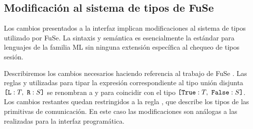 \subsection{Modificación al sistema de tipos de FuSe}

Los cambios presentados a la interfaz implican modificaciones al sistema de
tipos utilizado por FuSe. La sintaxis y semántica es esencialmente la estándar
para lenguajes de la familia ML sin ninguna extensión específica al chequeo de
tipos sesión.

Describiremos los cambios necesarios haciendo referencia al trabajo de FuSe
. Las reglas  y 
utilizadas para tipar la expresión correspondiente al tipo unión disjunta
$\set{ \Tag[L] : T,\ \Tag[R] : S}$ se renombran a  y
 para coincidir con el tipo $\BinaryLabels{T}{S}$. Los
cambios restantes quedan restringidos a la regla , que
describe los tipos de las primitivas de comunicación. En este caso las
modificaciones son análogas a las realizadas para la interfaz programática.
